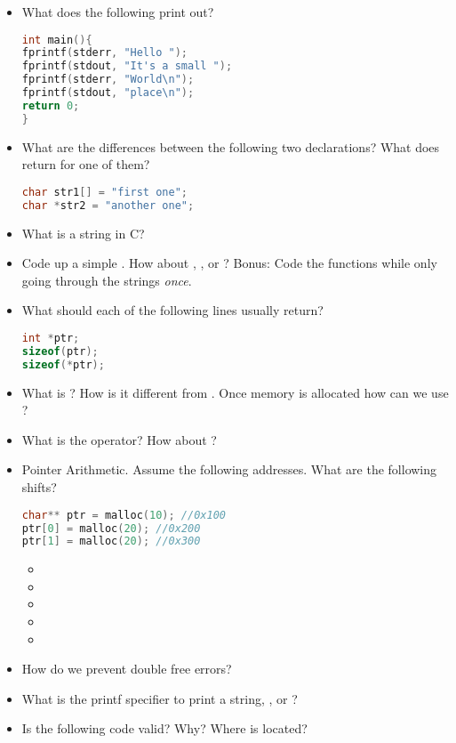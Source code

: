 \begin{itemize}
	\item
	      What does the following print out?

	      \begin{lstlisting}[language=C]
int main(){
fprintf(stderr, "Hello ");
fprintf(stdout, "It's a small ");
fprintf(stderr, "World\n");
fprintf(stdout, "place\n");
return 0;
}
\end{lstlisting}
	\item
	      What are the differences between the following two declarations? What
	      does  return for one of them?

	      \begin{lstlisting}[language=C]
char str1[] = "first one";
char *str2 = "another one";
\end{lstlisting}
	\item
	      What is a string in C?
	\item
	      Code up a simple . How about , , or ? Bonus: Code the functions while only going through the strings \emph{once}.
	\item
	      What should each of the following lines usually return?

	      \begin{lstlisting}[language=C]
int *ptr;
sizeof(ptr);
sizeof(*ptr);
\end{lstlisting}
	\item
	      What is ? How is it different from . Once memory is allocated how can we use ?
	\item
	      What is the \keyword{\&} operator? How about \keyword{*}?
	\item
	      Pointer Arithmetic. Assume the following addresses. What are the following shifts?

	      \begin{lstlisting}[language=C]
char** ptr = malloc(10); //0x100
ptr[0] = malloc(20); //0x200
ptr[1] = malloc(20); //0x300
\end{lstlisting}

	      \begin{itemize}
		      \tightlist
		      \item
		      \item
		      \item
		      \item
		      \item
	      \end{itemize}
	\item
	      How do we prevent double free errors?
	\item
	      What is the printf specifier to print a string, , or
	      ?
	\item
	      Is the following code valid? Why? Where is 
	      located?


\end{itemize}
